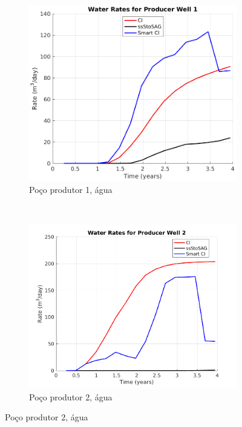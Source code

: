 \begin{figure}[!ht]
	\centering
	\begin{subfigure}[b]{.3\textwidth}
		\includegraphics[width=\textwidth]{figs/resultadosEgg/imgsim5/EGG_WaterWell1_Zoom}
		\caption{Po\c{c}o produtor 1, \'{a}gua}
		\label{EGG5_WaterWell1}
	\end{subfigure}
	~
	\begin{subfigure}[b]{.3\textwidth}
		\includegraphics[width=\textwidth]{figs/resultadosEgg/imgsim5/EGG_WaterWell2_Zoom}
		\caption{Po\c{c}o produtor 2, \'{a}gua}
		\label{EGG5_WaterWell2}
	\end{subfigure}
	

\end{figure}
